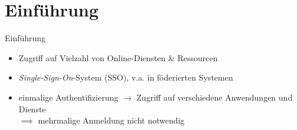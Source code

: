 
{
    \section{Einführung}
}

\begin{frame}{Einführung}
    \begin{itemize}
        \item Zugriff auf Vielzahl von Online-Diensten \& Ressourcen
        \item \emph{Single-Sign-On}-System (SSO), v.a. in föderierten Systemen

        \pause

        \item \alert{einmalige} Authentifizierung $\to$ Zugriff auf verschiedene Anwendungen und Dienste \\
            $\implies$ mehrmalige Anmeldung nicht notwendig \cite{switchIntroductionSWITCHaai2024}
    \end{itemize}
\end{frame}


